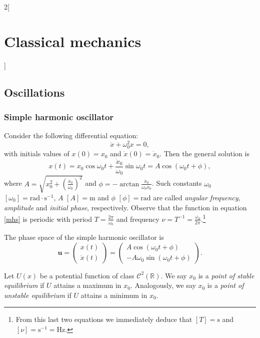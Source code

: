 \documentclass[../../../main.tex]{subfiles}
\begin{document}
\begin{multicols}{2}[\section{Classical mechanics}]
    \subsection{Oscillations}
    \subsubsection*{Simple harmonic oscillator}
    \begin{prop}
        Consider the following differential equation: $$\ddot{x}+\omega_0^2 x=0,$$ with initials values of $x(0)=x_0$ and $\dot{x}(0)=\dot{x}_0$. Then the general solution is
        \begin{equation}
            x(t)=x_0\cos\omega_0t+\frac{\dot{x}_0}{\omega_0}\sin\omega_0t=A\cos(\omega_0t+\phi),
            \label{mhs}
        \end{equation} where $\displaystyle A=\sqrt{x_0^2+\left(\frac{\dot{x}_0}{\omega_0}\right)^2}$ and $\displaystyle \phi=-\arctan\frac{\dot{x}_0}{\omega_0x_0}$. Such constants $\omega_0$ $[\omega_0]=\text{rad}\cdot \text{s}^{-1}$, $A$ $[A]=\text{m}$ and $\phi$ $[\phi]=\text{rad}$ are called \textit{angular frequency}, \textit{amplitude} and \textit{initial phase}, respectively. Observe that the function in equation \eqref{mhs} is periodic with period $T=\frac{2\pi}{\omega_0}$ and frequency $\nu=T^{-1}=\frac{\omega_0}{2\pi}$.\footnote{From this last two equations we immediately deduce that $[T]=\text{s}$ and $[\nu]=\text{s}^{-1}=\text{Hz}$.}
    \end{prop}
    \begin{prop}
        The phase space of the simple harmonic oscillator is $$\boldsymbol{u}=
            \begin{pmatrix}
                x(t) \\
                \dot{x}(t)
            \end{pmatrix}=
            \begin{pmatrix}
                A\cos(\omega_0t+\phi) \\
                -A\omega_0\sin(\omega_0t+\phi)
            \end{pmatrix}.$$
    \end{prop}
    \begin{definition}
        Let $U(x)$ be a potential function of class $\mathcal{C}^2(\mathbb{R})$. We say $x_0$ is a \textit{point of stable equilibrium} if $U$ attains a maximum in $x_0$. Analogously, we say $x_0$ is a \textit{point of unstable equilibrium} if $U$ attains a minimum in $x_0$.

\end{definition}
\end{multicols}
\end{document}
